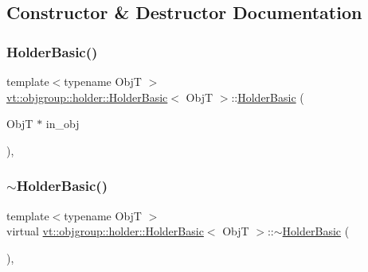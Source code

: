 \subsection{Constructor \& Destructor Documentation}
\mbox{\label{structvt_1_1objgroup_1_1holder_1_1_holder_basic_a0e74a9b5eb928c8d9cdaf81dd0994d7b}} 
\subsubsection{\texorpdfstring{Holder\+Basic()}{HolderBasic()}}
{\footnotesize\ttfamily template$<$typename ObjT $>$ \\
\hyperlink{structvt_1_1objgroup_1_1holder_1_1_holder_basic}{vt\+::objgroup\+::holder\+::\+Holder\+Basic}$<$ ObjT $>$\+::\hyperlink{structvt_1_1objgroup_1_1holder_1_1_holder_basic}{Holder\+Basic} (\begin{DoxyParamCaption}\item[{ObjT $\ast$}]{in\+\_\+obj }\end{DoxyParamCaption})\hspace{0.3cm}{\ttfamily [inline]}, {\ttfamily [explicit]}}

\mbox{\label{structvt_1_1objgroup_1_1holder_1_1_holder_basic_a7446aae8de5ccb8e9cceee2143ca29ea}} 
\subsubsection{\texorpdfstring{$\sim$\+Holder\+Basic()}{~HolderBasic()}}
{\footnotesize\ttfamily template$<$typename ObjT $>$ \\
virtual \hyperlink{structvt_1_1objgroup_1_1holder_1_1_holder_basic}{vt\+::objgroup\+::holder\+::\+Holder\+Basic}$<$ ObjT $>$\+::$\sim$\hyperlink{structvt_1_1objgroup_1_1holder_1_1_holder_basic}{Holder\+Basic} (\begin{DoxyParamCaption}{ }\end{DoxyParamCaption})\hspace{0.3cm}{\ttfamily [virtual]}, {\ttfamily [default]}}



